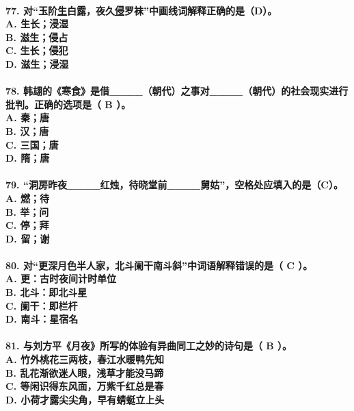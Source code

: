 \documentclass[UTF8]{ctexart} %
\begin{document}
\paragraph{
77. 对“玉阶\uline{生}白露，夜久\uline{侵}罗袜”中画线词解释正确的是（\color{red}D\color{black}）。 \\
    A. 生长；浸湿 \\
    B. 滋生；侵占 \\
    C. 生长；侵犯 \\
    D. 滋生；浸湿
}
\paragraph{
78. 韩翃的《寒食》是借\_\_\_\_（朝代）之事对\_\_\_\_（朝代）的社会现实进行批判。正确的选项是（ \color{red}B\color{black} ）。 \\
    A. 秦；唐 \\
    B. 汉；唐 \\
    C. 三国；唐 \\
    D. 隋；唐
}
\paragraph{
79. “洞房昨夜\_\_\_\_红烛，待晓堂前\_\_\_\_舅姑”，空格处应填入的是（\color{red}C\color{black}）。 \\
    A. 燃；待 \\
    B. 举；问 \\
    C. 停；拜 \\
    D. 留；谢
}
\paragraph{
80. 对“更深月色半人家，北斗阑干南斗斜”中词语解释错误的是（ \color{red}C\color{black} ）。 \\
    A. 更：古时夜间计时单位 \\
    B. 北斗：即北斗星 \\
    C. 阑干：即栏杆 \\
    D. 南斗：星宿名
}
\paragraph{
81. 与刘方平《月夜》所写的体验有异曲同工之妙的诗句是（ \color{red}B\color{black} ）。 \\
    A. 竹外桃花三两枝，春江水暖鸭先知 \\
    B. 乱花渐欲迷人眼，浅草才能没马蹄 \\
    C. 等闲识得东风面，万紫千红总是春 \\
    D. 小荷才露尖尖角，早有蜻蜓立上头
}
\end{document}
